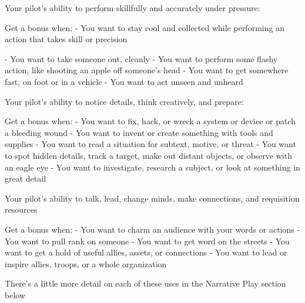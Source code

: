 Your pilot’s ability to perform skillfully and accurately under pressure:

Get a bonus when:
         - You want to stay cool and collected while performing an action that takes skill or
         precision




         - You want to take someone out, cleanly
         - You want to perform some flashy action, like shooting an apple off someone’s head
         - You want to get somewhere fast, on foot or in a vehicle
         - You want to act unseen and unheard

Your pilot’s ability to notice details, think creatively, and prepare:

Get a bonus when:
         - You want to fix, hack, or wreck a system or device or patch a bleeding wound
         - You want to invent or create something with tools and supplies
         - You want to read a situation for subtext, motive, or threat
         - You want to spot hidden details, track a target, make out distant objects, or observe with
         an eagle eye
         - You want to investigate, research a subject, or look at something in great detail

Your pilot’s ability to talk, lead, change minds, make connections, and requisition
resources

Get a bonus when:
         - You want to charm an audience with your words or actions
         - You want to pull rank on someone
         - You want to get word on the streets
         - You want to get a hold of useful allies, assets, or connections
         - You want to lead or inspire allies, troops, or a whole organization

There’s a little more detail on each of these uses in the Narrative Play section below